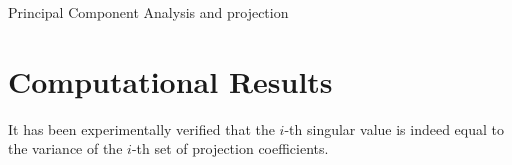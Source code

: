 \documentclass{article}
\begin{document}
\begin{algorithm}[!h]
	\begin{algorithmic}
	\end{algorithmic}
\caption{Principal Component Analysis and projection}
\label{alg:pca}
\end{algorithm}


\section{Computational Results}

It has been experimentally verified that the $i$-th singular value is indeed equal to the variance of the $i$-th set of projection coefficients. 
\end{document}
